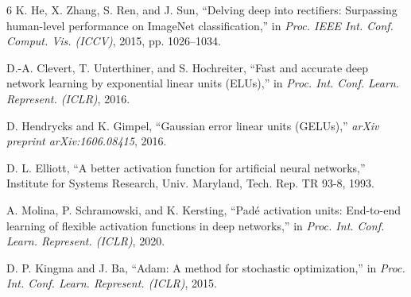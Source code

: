 \documentclass[conference]{IEEEtran}
\begin{document}
\begin{thebibliography}{6}
K. He, X. Zhang, S. Ren, and J. Sun, ``Delving deep into rectifiers: Surpassing human-level performance on ImageNet classification,'' in \textit{Proc. IEEE Int. Conf. Comput. Vis. (ICCV)}, 2015, pp. 1026--1034.

D.-A. Clevert, T. Unterthiner, and S. Hochreiter, ``Fast and accurate deep network learning by exponential linear units (ELUs),'' in \textit{Proc. Int. Conf. Learn. Represent. (ICLR)}, 2016.

D. Hendrycks and K. Gimpel, ``Gaussian error linear units (GELUs),'' \textit{arXiv preprint arXiv:1606.08415}, 2016.

D. L. Elliott, ``A better activation function for artificial neural networks,'' Institute for Systems Research, Univ. Maryland, Tech. Rep. TR 93-8, 1993.

A. Molina, P. Schramowski, and K. Kersting, ``Pad\'e activation units: End-to-end learning of flexible activation functions in deep networks,'' in \textit{Proc. Int. Conf. Learn. Represent. (ICLR)}, 2020.

D. P. Kingma and J. Ba, ``Adam: A method for stochastic optimization,'' in \textit{Proc. Int. Conf. Learn. Represent. (ICLR)}, 2015.
\end{thebibliography}
\end{document}
